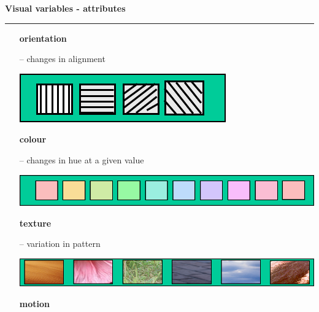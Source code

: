 \documentclass[pdf]{beamer}
\begin{document}
\begin{frame}
{\textbf{Visual variables - attributes}}{\textcolor{red}{\rule{12cm}{1.2pt}}}

     \begin{itemize}           
     	\item[]\hspace{-15px}\textbf{{orientation}}     	
        \item[--]{\small{changes in alignment}}       
        
\includegraphics[scale=0.45]{2_Imagine7.png}     
        
     	\item[]\hspace{-15px}\textbf{{colour}}     	
        \item[--]{\small{changes in hue at a given value}} 

\includegraphics[scale=0.45]{2_Imagine8.png}     
               
     	\item[]\hspace{-15px}\textbf{{texture}}     	
        \item[--]{\small{variation in pattern}}        

\includegraphics[scale=0.45]{2_Imagine9.png}   
        
        \item[]\hspace{-15px}\textbf{{motion}}    
        
     \end{itemize}

\end{frame}
\end{document}
